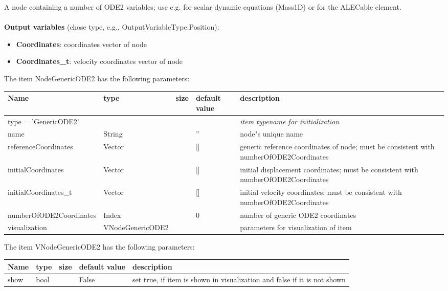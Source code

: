 A node containing a number of ODE2 variables; use e.g. for scalar dynamic equations (Mass1D) or for the ALECable element.
 \\\\ 
{\bf Output variables} (chose type, e.g., OutputVariableType.Position): 
\begin{itemize}
    \item {\bf Coordinates}: coordinates vector of node
    \item {\bf Coordinates\_t}: velocity coordinates vector of node
\end{itemize}
The item NodeGenericODE2 has the following parameters:
\begin{center}
  \footnotesize
  \begin{longtable}{| p{4.5cm} | p{2.5cm} | p{0.5cm} | p{2.5cm} | p{6cm} |}
    \hline
    \bf Name & \bf type & \bf size & \bf default value & \bf description \\ \hline
    \multicolumn{4}{l}{\parbox{10cm}{type = 'GenericODE2'}} & \multicolumn{1}{l}{\parbox{6cm}{\it item typename for initialization}}\\ \hline
    name &     String &      &     '' &     node"s unique name\\ \hline
    referenceCoordinates &     Vector &      &     [] &     generic reference coordinates of node; must be consistent with numberOfODE2Coordinates\\ \hline
    initialCoordinates &     Vector &      &     [] &     initial displacement coordinates; must be consistent with numberOfODE2Coordinates\\ \hline
    initialCoordinates\_t &     Vector &      &     [] &     initial velocity coordinates; must be consistent with numberOfODE2Coordinates\\ \hline
    numberOfODE2Coordinates &     Index &      &     0 &     number of generic ODE2 coordinates\\ \hline
    visualization & VNodeGenericODE2 & & & parameters for visualization of item \\ \hline
	  \end{longtable}
	\end{center}
The item VNodeGenericODE2 has the following parameters:
\begin{center}
  \footnotesize
  \begin{longtable}{| p{4.5cm} | p{2.5cm} | p{0.5cm} | p{2.5cm} | p{6cm} |}
    \hline
    \bf Name & \bf type & \bf size & \bf default value & \bf description \\ \hline
    show &     bool &      &     False &     set true, if item is shown in visualization and false if it is not shown\\ \hline
	  \end{longtable}
	\end{center}

